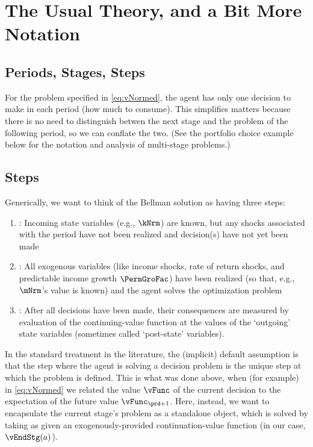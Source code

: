 
\hypertarget{the-usual-theory}{}
\section{The Usual Theory, and a Bit More Notation}\label{sec:the-usual-theory}


\subsection{Periods, Stages, Steps}

For the problem specified in \eqref{eq:vNormed}, the agent has only one decision to make in each {period} (how much to consume). %
This simplifies matters because there is no need to distinguish betwen the next {stage} and the problem of the following {period}, so we can conflate the two.  (See the portfolio choice example below for the notation and analysis of multi-{stage} problems.)

\subsection{Steps}

Generically, we want to think of the Bellman solution as having three {steps}:
\begin{enumerate}
\item \textbf{\Arrival}: Incoming state variables (e.g., $\kNrm$) are known, but any shocks associated with the period have not been realized and decision(s) have not yet been made
\item \textbf{\Decision}: All exogenous variables (like income shocks, rate of return shocks, and predictable income growth $\PermGroFac$) have been realized (so that, e.g., $\mNrm$'s value is known) and the agent solves the optimization problem
\item \textbf{\Continuation}: After all decisions have been made, their consequences are measured by evaluation of the continuing-value function at the values of the `outgoing' state variables (sometimes called `post-state' variables).
\end{enumerate}

In the standard treatment in the literature, the (implicit) default assumption is that the {step} where the agent is solving a decision problem is the unique {step} at which the problem is defined.  This is what was done above, when (for example) in \eqref{eq:vNormed} we related the value $\vFunc$ of the current decision to the expectation of the future value $\vFunc_{\prd+1}$.  Here, instead, we want to encapsulate the current {stage}'s problem as a standalone object, which is solved by taking as given an exogenously-provided continuation-value function (in our case, $\vEndStg(a)$).


